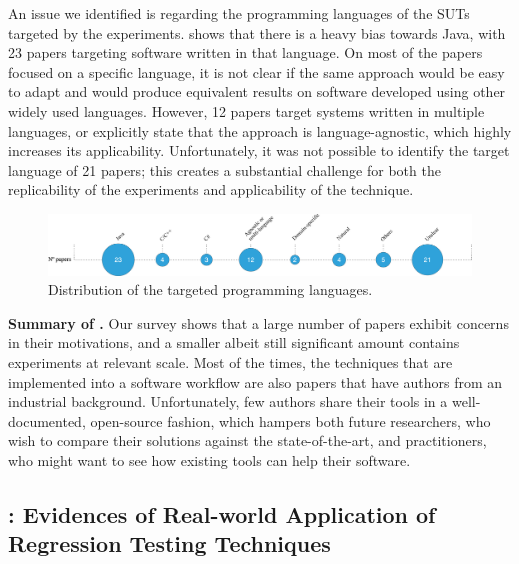 An issue we identified is regarding the programming languages of the SUTs targeted by the experiments.
 shows that there is a heavy bias towards Java, with 23 papers targeting software written in that language.
On most of the papers focused on a specific language, it is not clear if the same approach would be easy to adapt and would produce equivalent results on software developed using other widely used languages.
However, 12 papers target systems written in multiple languages, or explicitly state that the approach is language-agnostic, which highly increases its applicability.
Unfortunately, it was not possible to identify the target language of 21 papers; this creates a substantial challenge for both the replicability of the experiments and applicability of the technique.


\begin{figure}
  \center
  \includegraphics[width=\linewidth]{figures/programming_languages.png}
  \caption{Distribution of the targeted programming languages.}
  \label{fig:programming_languages}
\end{figure}


\begin{tcolorbox}%
\textbf{Summary of .}
Our survey shows that a large number of papers exhibit \rea concerns in their motivations, and a smaller albeit still significant amount contains experiments at relevant scale. 
Most of the times, the techniques that are implemented into a software workflow are also papers that have authors from an industrial background. %
Unfortunately, few authors share their tools in a well-documented, open-source fashion, which hampers both future researchers, who wish to compare their solutions against the state-of-the-art, and practitioners, who might want to see how existing \rt tools can help their software.
\end{tcolorbox}






\subsection{: Evidences of Real-world Application of Regression Testing Techniques}
\label{sec:lit_rq3}

